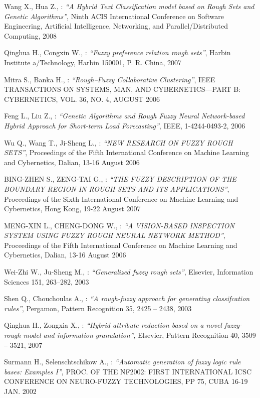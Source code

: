 \begin{thebibliography}{99}
	Wang X., Hua Z., : \textit{``A Hybrid Text Classification model based on Rough Sets and Genetic
	Algorithms''}, Ninth ACIS International Conference on Software Engineering, Artificial Intelligence,
	Networking, and Parallel/Distributed Computing, 2008

	Qinghua H., Congxin W., : \textit{``Fuzzy preference relation rough sets''},
	Harbin Institute a/Technology, Harbin 150001, P. R. China, 2007

	Mitra S., Banka H., : \textit{``Rough–Fuzzy Collaborative Clustering''},
	IEEE TRANSACTIONS ON SYSTEMS, MAN, AND CYBERNETICS—PART B: CYBERNETICS, VOL. 36, NO. 4, AUGUST 2006

	Feng L., Liu Z., : \textit{``Genetic Algorithms and Rough Fuzzy Neural Network-based Hybrid Approach for Short-term
	Load Forecasting''}, IEEE, 1-4244-0493-2, 2006

	Wu Q., Wang T., Ji-Sheng L., : \textit{``NEW RESEARCH ON FUZZY ROUGH SETS''}, 
	Proceedings of the Fifth International Conference on Machine Learning and Cybernetics, Dalian, 13-16 August 2006

	BING-ZHEN S., ZENG-TAI G., : \textit{``THE FUZZY DESCRIPTION OF THE BOUNDARY REGION IN ROUGH SETS AND ITS APPLICATIONS''}, 
	Proceedings of the Sixth International Conference on Machine Learning and Cybernetics, Hong Kong, 19-22 August 2007

	MENG-XIN L., CHENG-DONG W., : \textit{``A VISION-BASED INSPECTION SYSTEM USING FUZZY ROUGH NEURAL
	NETWORK METHOD''}, Proceedings of the Fifth International Conference on Machine Learning and Cybernetics, 
	Dalian, 13-16 August 2006

	Wei-Zhi W., Ju-Sheng M., : \textit{``Generalized fuzzy rough sets''}, Elsevier, Information Sciences 151, 263–282, 2003

	Shen Q., Chouchoulas A., : \textit{``A rough-fuzzy approach for generating classifcation rules''}, 
	Pergamon, Pattern Recognition 35, 2425 – 2438, 2003

	Qinghua H., Zongxia X., : \textit{``Hybrid attribute reduction based on a novel fuzzy-rough model and
	information granulation''}, Elsevier, Pattern Recognition 40, 3509 – 3521, 2007

	Surmann H., Selenschtschikow A., : \textit{``Automatic generation of fuzzy logic rule bases: Examples I''}, 
    PROC. OF THE NF2002: FIRST INTERNATIONAL ICSC CONFERENCE ON NEURO-FUZZY TECHNOLOGIES, PP 75, CUBA 16-19 JAN. 2002


\end{thebibliography}
